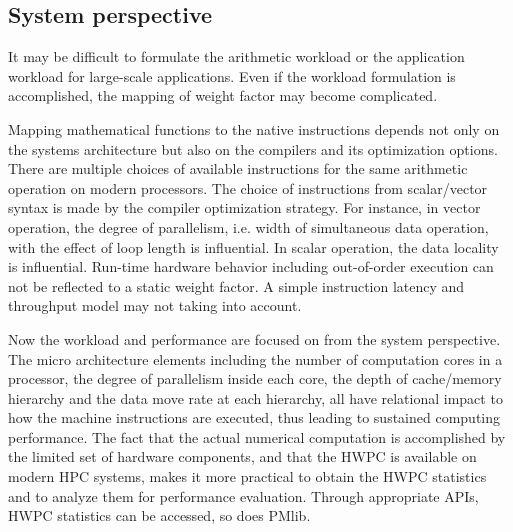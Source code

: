\documentclass[conference]{IEEEtran}
\begin{document}
%
\subsection{System perspective}
\label{subsection:system-perspective}

It may be difficult to formulate the arithmetic workload
or the application workload for large-scale applications.
Even if the workload formulation is accomplished,
the mapping of weight factor may become complicated.

Mapping mathematical functions to the native instructions
depends not only on the systems architecture but also on the compilers
and its optimization options.
There are multiple choices of available instructions for the same
arithmetic operation on modern processors.
The choice of instructions from scalar/vector syntax is made by the
compiler optimization strategy.
For instance,
in vector operation, the degree of parallelism, i.e. width of simultaneous data
operation, with the effect of loop length is influential.
In scalar operation, the data locality is influential.
Run-time hardware behavior including out-of-order execution can not
be reflected to a static weight factor.
A simple instruction latency and throughput model may not taking into account.

Now the workload and performance are focused on from the system perspective.
The micro architecture elements including the number of computation cores
in a processor, the degree of parallelism inside each core,
the depth of cache/memory hierarchy and the data move rate at each hierarchy,
all have relational impact to how the machine instructions are executed,
thus leading to sustained computing performance.
The fact that the actual numerical computation is accomplished by the
limited set of hardware components, and that the HWPC is available
on modern HPC systems, makes it more practical to obtain the HWPC statistics
and to analyze them for performance evaluation.
Through appropriate APIs, HWPC statistics can be accessed, so does PMlib.
\end{document}
